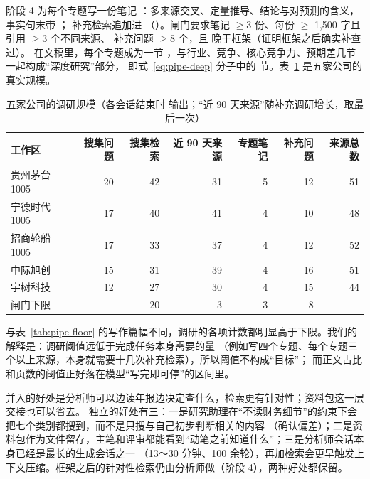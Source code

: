 阶段 4 为每个专题写一份笔记 ：多来源交叉、定量推导、结论与对预测的含义，事实句末带 \code{[S编号]}；
补充检索追加进 （）。闸门要求笔记 $\ge 3$ 份、每份 $\ge$ 1,500 字且引用 $\ge 3$ 个不同来源、
补充问题 $\ge 8$ 个，且  晚于框架（证明框架之后确实补查过）。
在文稿里，每个专题成为一节 ，与行业、竞争、核心竞争力、预期差几节一起构成“深度研究”部分，
即式~\eqref{eq:pipe-deep} 分子中的  节。表~\ref{tab:pipe-research-stats} 是五家公司的真实规模。

\begin{table}[h]
\centering\small
\caption{五家公司的调研规模（各会话结束时  输出；“近 90 天来源”随补充调研增长，取最后一次）}
\label{tab:pipe-research-stats}
\begin{tabular}{@{}lrrrrrr@{}}
\toprule
工作区 & 搜集问题 & 搜集检索 & 近 90 天来源 & 专题笔记 & 补充问题 & 来源总数 \\
\midrule
贵州茅台 1005 & 20 & 42 & 31 & 5 & 12 & 51 \\
宁德时代 1005 & 17 & 40 & 41 & 4 & 10 & 48 \\
招商轮船 1005 & 17 & 33 & 37 & 4 & 12 & 52 \\
中际旭创 & 15 & 31 & 39 & 4 & 16 & 51 \\
宇树科技 & 12 & 27 & 30 & 4 & 15 & 44 \\
\midrule
闸门下限 & — & 20 & 3 & 3 & 8 & — \\
\bottomrule
\end{tabular}
\end{table}

与表~\ref{tab:pipe-floor} 的写作篇幅不同，调研的各项计数都明显高于下限。我们的解释是：调研阈值远低于完成任务本身需要的量
（例如写四个专题、每个专题三个以上来源，本身就需要十几次补充检索），所以阈值不构成“目标”；
而正文占比和页数的阈值正好落在模型“写完即可停”的区间里。

\begin{tradeoff}
并入的好处是分析师可以边读年报边决定查什么，检索更有针对性；资料包这一层交接也可以省去。
独立的好处有三：一是研究助理在“不读财务细节”的约束下会把七个类别都搜到，而不是只搜与自己初步判断相关的内容
（确认偏差）；二是资料包作为文件留存，主笔和评审都能看到“动笔之前知道什么”；三是分析师会话本身已经是最长的生成会话之一
（13～30 分钟、100 余轮），再加检索会更早触发上下文压缩。框架之后的针对性检索仍由分析师做（阶段 4），两种好处都保留。
\end{tradeoff}

